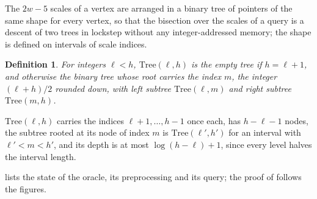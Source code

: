 \documentclass[11pt]{article}
\newtheorem{definition}[theorem]{Definition}
\theoremstyle{remark}
\begin{document}
The $2w-5$ scales of a vertex are arranged in a binary tree of pointers
of the same shape for every vertex, so that the bisection over the scales
of a query is a descent of two trees in lockstep without any
integer-addressed memory; the shape is defined on intervals of scale
indices.
\begin{definition}\label{def:packed-tree}
For integers $\ell<h$, $\mathrm{Tree}(\ell,h)$ is the empty tree if
$h=\ell+1$, and otherwise the binary tree whose root carries the index
$m$, the integer $(\ell+h)/2$ rounded down, with left subtree
$\mathrm{Tree}(\ell,m)$ and right subtree $\mathrm{Tree}(m,h)$.
\end{definition}
$\mathrm{Tree}(\ell,h)$ carries the indices $\ell+1,\dots,h-1$ once each,
has $h-\ell-1$ nodes, the subtree rooted at its node of index $m$ is
$\mathrm{Tree}(\ell',h')$ for an interval with $\ell'<m<h'$, and its depth
is at most $\log(h-\ell)+1$, since every level halves the interval length.

 lists the state of the oracle,
 its preprocessing and  its
query; the proof of  follows the figures.
\end{document}
